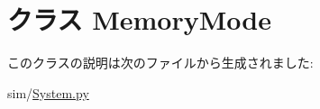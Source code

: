 \hypertarget{classSystem_1_1MemoryMode}{
\section{クラス MemoryMode}
\label{classSystem_1_1MemoryMode}
}


このクラスの説明は次のファイルから生成されました:\begin{DoxyCompactItemize}
\item 
sim/\hyperlink{System_8py}{System.py}\end{DoxyCompactItemize}
